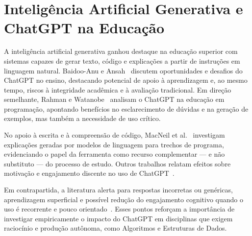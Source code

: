 

\section{Inteligência Artificial Generativa e ChatGPT na Educação}
\label{sec:ia-generativa-educacao}

A inteligência artificial generativa ganhou destaque na educação superior com sistemas capazes de gerar texto, código e explicações a partir de instruções em linguagem natural. Baidoo-Anu e Ansah~\cite{baidoo2023education} discutem oportunidades e desafios do ChatGPT no ensino, destacando potencial de apoio à aprendizagem e, ao mesmo tempo, riscos à integridade acadêmica e à avaliação tradicional. Em direção semelhante, Rahman e Watanobe~\cite{rahman2023education} analisam o ChatGPT na educação em programação, apontando benefícios no esclarecimento de dúvidas e na geração de exemplos, mas também a necessidade de uso crítico.

No apoio à escrita e à compreensão de código, MacNeil et al.~\cite{macneil2022code} investigam explicações geradas por modelos de linguagem para trechos de programa, evidenciando o papel da ferramenta como recurso complementar --- e não substituto --- do processo de estudo. Outros trabalhos relatam efeitos sobre motivação e engajamento discente no uso de ChatGPT~\cite{sotelo2023motivation}.

Em contrapartida, a literatura alerta para respostas incorretas ou genéricas, aprendizagem superficial e possível redução do engajamento cognitivo quando o uso é recorrente e pouco orientado~\cite{dwivedi2023chatgpt,delikoura2025superficial,qin2023general,kosmyna2025brain}. Esses pontos reforçam a importância de investigar empiricamente o impacto do ChatGPT em disciplinas que exigem raciocínio e produção autônoma, como Algoritmos e Estruturas de Dados.

